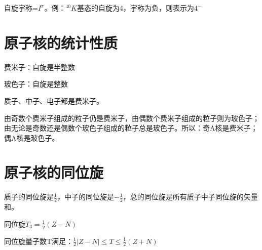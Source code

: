 自旋宇称=$I^{\pi}$。例：$^{40}K$基态的自旋为4，宇称为负，则表示为$4^{-}$

\section{原子核的统计性质}

费米子：自旋是半整数

玻色子：自旋是整数

质子、中子、电子都是费米子。

由奇数个费米子组成的粒子仍是费米子，由偶数个费米子组成的粒子则为玻色子；由无论是奇数还是偶数个玻色子组成的粒子总是玻色子。所以：奇A核是费米子；偶A核是玻色子。

\section{原子核的同位旋}

质子的同位旋是$\frac{1}{2}$，中子的同位旋是$-\frac{1}{2}$，总的同位旋是所有质子中子同位旋的矢量和。

同位旋$T_3 = \frac{1}{2}(Z-N)$

同位旋量子数T满足：$\frac{1}{2}\left\lvert Z - N\right\rvert \leq T \leq \frac{1}{2}(Z + N)$

\clearpage
